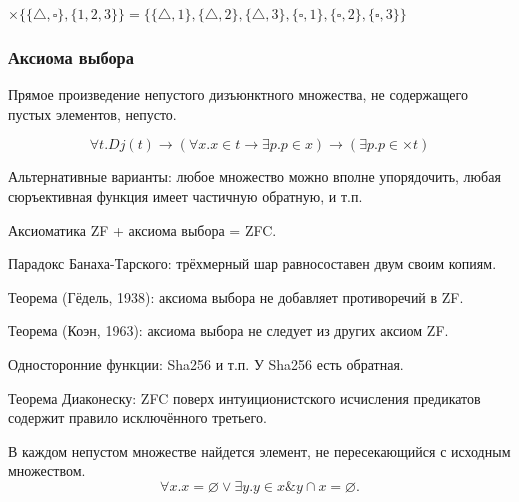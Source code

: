 \begin{example}
$\times\{\{\triangle,\square\},\{1,2,3\}\} = \{\{\triangle,1\},\{\triangle,2\},\{\triangle,3\},\{\square,1\},\{\square,2\},\{\square,3\}\}$
\end{example}

\subsubsection{Аксиома выбора}
\begin{definition}
Прямое произведение непустого дизъюнктного множества,
не содержащего пустых элементов, непусто.

$$\forall t.Dj (t) \rightarrow
(\forall x.x \in t \rightarrow \exists p.p \in x) \rightarrow
(\exists p.p \in \times t)$$
\end{definition}

Альтернативные варианты: любое множество можно вполне упорядочить,  любая сюръективная функция имеет частичную обратную, и т.п.

\begin{definition}
   Аксиоматика ZF + аксиома выбора = ZFC.
\end{definition}

\begin{example}
   Парадокс Банаха-Тарского: трёхмерный шар равносоставен двум своим копиям.
\end{example}
\begin{theorem}
   Теорема (Гёдель, 1938): аксиома выбора не добавляет противоречий в ZF.
\end{theorem}
\begin{theorem}
   Теорема (Коэн, 1963): аксиома выбора не следует из других аксиом ZF.
\end{theorem}
\begin{example}
   Односторонние функции: Sha256 и т.п. У Sha256 есть обратная.
\end{example}

\begin{theorem}
   Теорема Диаконеску: ZFC поверх интуиционистского исчисления предикатов содержит правило исключённого третьего.
\end{theorem}

\begin{definition}

   В каждом непустом множестве найдется элемент, не пересекающийся с исходным множеством.
\[ \forall x .x = \varnothing \vee \exists y .y \in x \& y \cap x = \varnothing. \]
\end{definition}

